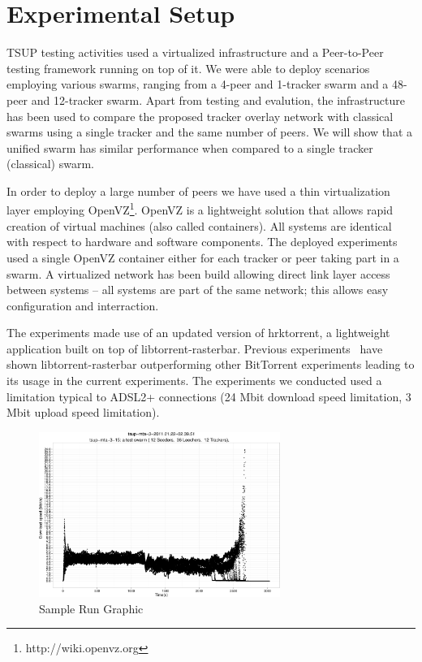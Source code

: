 \section{Experimental Setup}
\label{sec:unified-tracker:setup}

TSUP testing activities used a virtualized infrastructure and a
Peer-to-Peer testing framework running on top of it. We were able to deploy
scenarios employing various swarms, ranging from a 4-peer and 1-tracker swarm
and a 48-peer and 12-tracker swarm. Apart from testing and evalution, the
infrastructure has been used to compare the proposed tracker overlay network
with classical swarms using a single tracker and the same number of peers. We
will show that a unified swarm has similar performance when compared to a
single tracker (classical) swarm.

In order to deploy a large number of peers we have used a thin virtualization
layer employing OpenVZ\footnote{http://wiki.openvz.org}. OpenVZ is a
lightweight solution that allows rapid creation of virtual machines (also
called containers). All systems are identical with respect to hardware and
software components. The deployed experiments used a single OpenVZ container
either for each tracker or peer taking part in a swarm. A virtualized network
has been build allowing direct link layer access between systems -- all
systems are part of the same network; this allows easy configuration and
interraction.

The experiments made use of an updated version of hrktorrent, a lightweight
application built on top of libtorrent-rasterbar. Previous
experiments~\cite{bt-vi} have shown libtorrent-rasterbar outperforming other
BitTorrent experiments leading to its usage in the current experiments. The
experiments we conducted used a limitation typical to ADSL2+ connections (24
Mbit download speed limitation, 3 Mbit upload speed limitation).

\begin{figure}[h]
  \begin{center}
    \includegraphics[width=0.7\textwidth]{src/img/unified-tracker/tsup-sample-run-48peers}
  \end{center}
  \caption{Sample Run Graphic}
  \label{fig:unified-tracker:tsup-sample-run}
\end{figure}

